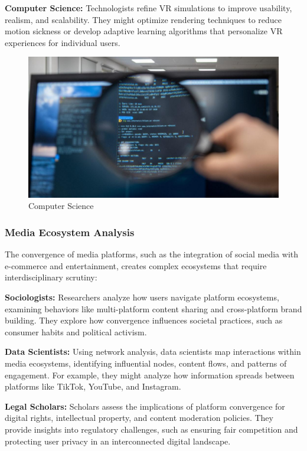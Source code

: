 \documentclass[
]{book}
\begin{document}
\textbf{Computer Science:} Technologists refine VR simulations to improve usability, realism, and scalability. They might optimize rendering techniques to reduce motion sickness or develop adaptive learning algorithms that personalize VR experiences for individual users.

\begin{figure}
\centering
\includegraphics[width=1\textwidth,height=\textheight]{images/compsci.jpg}
\caption{Computer Science}
\end{figure}

\subsubsection{Media Ecosystem Analysis}\label{media-ecosystem-analysis}

The convergence of media platforms, such as the integration of social media with e-commerce and entertainment, creates complex ecosystems that require interdisciplinary scrutiny:

\textbf{Sociologists:} Researchers analyze how users navigate platform ecosystems, examining behaviors like multi-platform content sharing and cross-platform brand building. They explore how convergence influences societal practices, such as consumer habits and political activism.

\textbf{Data Scientists:} Using network analysis, data scientists map interactions within media ecosystems, identifying influential nodes, content flows, and patterns of engagement. For example, they might analyze how information spreads between platforms like TikTok, YouTube, and Instagram.

\textbf{Legal Scholars:} Scholars assess the implications of platform convergence for digital rights, intellectual property, and content moderation policies. They provide insights into regulatory challenges, such as ensuring fair competition and protecting user privacy in an interconnected digital landscape.
\end{document}
